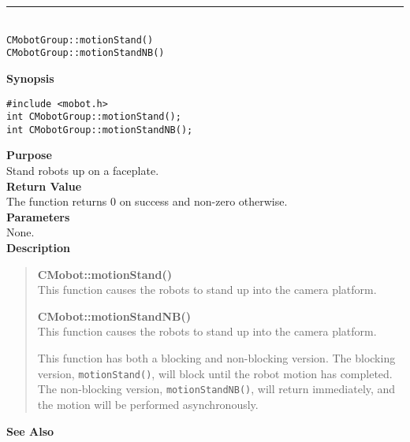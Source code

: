 \noindent
\vspace{5pt}
\rule{4.5in}{0.015in}\\
\noindent
{\LARGE \texttt{CMobotGroup::motionStand()}}\\
{\LARGE \texttt{CMobotGroup::motionStandNB()}}\\
{}

\noindent
{\bf Synopsis}
\vspace{-8pt}
\begin{verbatim}
#include <mobot.h>
int CMobotGroup::motionStand();
int CMobotGroup::motionStandNB();
\end{verbatim}

\noindent
{\bf Purpose}\\
Stand robots up on a faceplate.\\

\noindent
{\bf Return Value}\\
The function returns 0 on success and non-zero otherwise.\\

\noindent
{\bf Parameters}\\
None.\\

\noindent
{\bf Description}\\
\vspace{-12pt}
\begin{quote}
{\bf CMobot::motionStand()}\\
This function causes the robots to stand up into the camera platform.

{\bf CMobot::motionStandNB()}\\
This function causes the robots to stand up into the camera platform.

This function has both a blocking and non-blocking version.
The blocking version, \texttt{motionStand()}, will block until the
robot motion has completed. The non-blocking version, \texttt{motionStandNB()},
will return immediately, and the motion will be performed asynchronously.\\
\end{quote}

\noindent
{\bf See Also}\\

